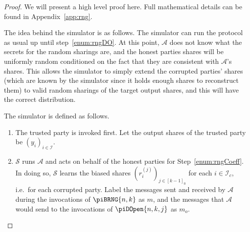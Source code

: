 \documentclass{article}
\newcommand{\seqZ}[1]{\left[#1\right]_0}
\theoremstyle{remark}
\begin{document}
\begin{proof}
	\newcommand{\proto}{\piRNG{n,k}}

	We will present a high level proof here. Full mathematical details can be
	found in Appendix~\ref{app:rng}.

	The idea behind the simulator is as follows. The simulator can run the
	protocol as usual up until step~\ref{enum:rngDO}. At this point,
	$\mathcal{A}$ does not know what the secrets for the random sharings are,
	and the honest parties shares will be uniformly random conditioned on the
	fact that they are consistent with $\mathcal{A}$'s shares. This allows the
	simulator to simply extend the corrupted parties' shares (which are known
	by the simulator since it holds enough shares to reconstruct them) to valid
	random sharings of the target output shares, and this will have the correct
	distribution.

	The simulator is defined as follows.
	\begin{enumerate}
		\item The trusted party is invoked first. Let the output shares of the
			trusted party be ${(y_i)}_{i \in \mathcal{I}}$.

		\item $\mathcal{S}$ runs $\mathcal{A}$ and acts on behalf of the honest
			parties for Step~\ref{enum:rngCoeff}. In doing so, $\mathcal{S}$
			learns the biased shares ${\left(r_i^{(j)}\right)}_{j \in
			\seqZ{k-1}}$ for each $i \in \mathcal{I}_c$, i.e.\ for each
			corrupted party. Label the messages sent and received by
			$\mathcal{A}$ during the invocations of $\piBRNG{n,k}$ as $m$, and
			the messages that $\mathcal{A}$ would send to the invocations of
			$\piDOpen{n,k,j}$ as $m_o$.


\end{enumerate}
\end{proof}
\end{document}
